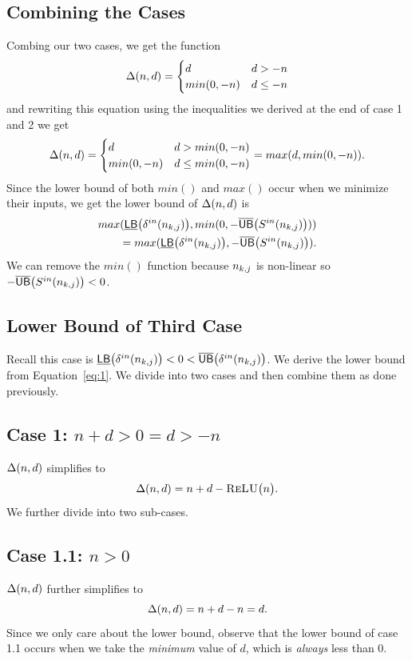 \subsection*{Combining the Cases}
Combing our two cases, we get the function
\[
	\Delta(n,d) = \begin{cases}
	d & d > -n\\
	min(0, -n) & d \leq -n
	\end{cases}
\]
and rewriting this equation using the inequalities we derived at the end of case 1 and 2
we get
\[
\Delta(n,d) = \begin{cases}
d & d > min(0, -n)\\
min(0, -n) & d \leq min(0, -n)
\end{cases} = max(d, min(0, -n)).
\]
Since the lower bound of both $ min() $ and $ max() $ occur when we minimize their inputs, we get the lower bound of $ \Delta(n,d) $ is
\begin{align*}
max(\underline{\mathsf{LB}}\big(\delta^{in}(n_{k,j})\big), min(0, -\overline{\mathsf{UB}}\big(S^{in}(n_{k,j})\big)))\\
= max(\underline{\mathsf{LB}}\big(\delta^{in}(n_{k,j})\big), -\overline{\mathsf{UB}}\big(S^{in}(n_{k,j})\big)).
\end{align*}
We can remove the $ min() $ function because $ n_{k,j} $ is non-linear so $ -\overline{\mathsf{UB}}\big(S^{in}(n_{k,j})\big) < 0 $.

\subsection{Lower Bound of Third Case}
Recall this case is $ \underline{\mathsf{LB}}\big(\delta^{in}(n_{k,j})\big) < 0 < \overline{\mathsf{UB}}\big(\delta^{in}(n_{k,j})\big) $. We derive the lower bound from Equation~\ref{eq:1}. We divide into two cases and then combine them as done previously.

\subsection*{Case 1: $ n + d > 0 = d > -n $}
$ \Delta(n,d) $ simplifies to
\[
	\Delta(n,d) = n + d - \textsc{ReLU}\big(n\big).
\]
We further divide into two sub-cases.

\subsection*{Case 1.1: $ n > 0 $}
$ \Delta(n,d) $ further simplifies to
\[
	\Delta(n,d) = n + d - n = d.
\]
Since we only care about the lower bound, observe that the lower bound of
case 1.1 occurs when we take the \textit{minimum} value of $ d $, which is \textit{always} less than 0.

